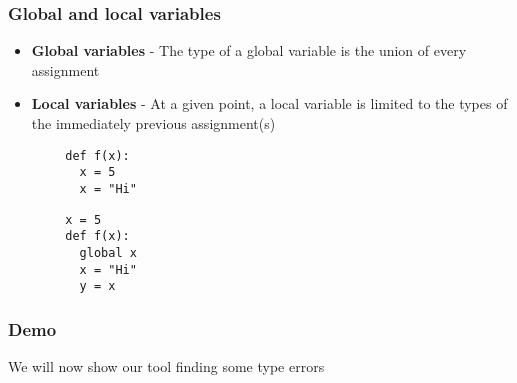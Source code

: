 \documentclass{beamer}
\begin{document}
\begin{frame}[fragile]
    \frametitle{Global and local variables}
    \begin{itemize}
    		\item \textbf{Global variables} - The type of a global variable is the union of every assignment
    		\item \textbf{Local variables} - At a given point, a local variable is limited to the types of the immediately previous assignment(s)
    \end{itemize}
    
    \begin{lstlisting}
        def f(x):
          x = 5
          x = "Hi"
    \end{lstlisting}
    \begin{lstlisting}
        x = 5
        def f(x):
          global x
          x = "Hi"
          y = x
    \end{lstlisting}
\end{frame}
  
  
  \begin{frame}
    \frametitle{Demo}
    We will now show our tool finding some type errors
  \end{frame}
  
  
  
  
  
  
  
  
  
\end{document}
